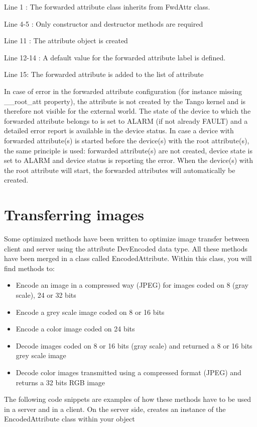 Line 1 : The forwarded attribute class inherits from FwdAttr class.

Line 4-5 : Only constructor and destructor methods are required

Line 11 : The attribute object is created

Line 12-14 : A default value for the forwarded attribute label is
defined.

Line 15: The forwarded attribute is added to the list of attribute

In case of error in the forwarded attribute configuration (for instance
missing \_\_root\_att property), the attribute is not created by the
Tango kernel and is therefore not visible for the external world.
The state of the device to which the forwarded attribute belongs to
is set to ALARM (if not already FAULT) and a detailed error report
is available in the device status. In case a device with forwarded
attribute(s) is started before the device(s) with the root attribute(s),
the same principle is used: forwarded attribute(s) are not created,
device state is set to ALARM and device status is reporting the error.
When the device(s) with the root attribute will start, the forwarded
attributes will automatically be created. 

\section{Transferring images}

Some optimized methods have been written to optimize image transfer
between client and server using the attribute DevEncoded
data type. All these methods have been merged in a class called EncodedAttribute.
Within this class, you will find methods to:
\begin{itemize}
\item Encode an image in a compressed way (JPEG) for images
coded on 8 (gray scale), 24 or 32 bits
\item Encode a grey scale image coded on 8 or 16 bits
\item Encode a color image coded on 24 bits
\item Decode images coded on 8 or 16 bits (gray scale) and returned a 8
or 16 bits grey scale image
\item Decode color images transmitted using a compressed format (JPEG) and
returns a 32 bits RGB image
\end{itemize}
The following code snippets are examples of how these methods have
to be used in a server and in a client. On the server side, creates
an instance of the EncodedAttribute class
within your object

